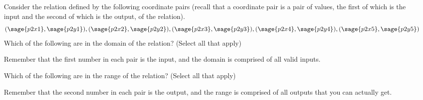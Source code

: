 \documentclass{ximera}
\begin{document}
\begin{problem}
    Consider the relation defined by the following coordinate pairs (recall that a coordinate pair is a pair of values, the first of which is the input and the second of which is the output, of the relation).
    \[
        (\sage{p2x1},\sage{p2y1}),(\sage{p2x2},\sage{p2y2}),(\sage{p2x3},\sage{p2y3}),(\sage{p2x4},\sage{p2y4}),(\sage{p2x5},\sage{p2y5})
    \]
    Which of the following are in the domain of the relation? (Select all that apply)
    \begin{selectAll}
    \end{selectAll}
    \begin{feedback}
        Remember that the first number in each pair is the input, and the domain is comprised of all valid inputs.
    \end{feedback}
    \begin{problem}
        Which of the following are in the range of the relation? (Select all that apply)
        \begin{selectAll}
        \end{selectAll}
        \begin{feedback}
            Remember that the second number in each pair is the output, and the range is comprised of all outputs that you can actually get.
        \end{feedback}
    \end{problem}
\end{problem}
\end{document}
